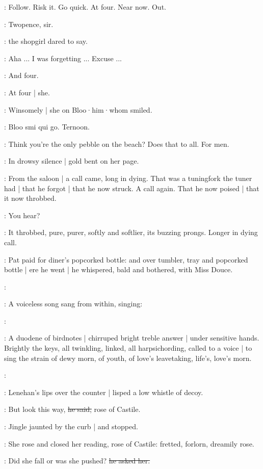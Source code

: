 \BloomIntA:
Follow.
Risk it.
Go quick.
At four.
Near now.
Out.

\shopgirl:
Twopence,
sir.

:
the shopgirl dared to say.

\Bloom:
Aha ...
I was forgetting ...
Excuse ...

\shopgirl:
And four.

\BloomIntA:
At four |
she.

:
Winsomely |
she on Bloo·him·whom smiled.

:
Bloo smi qui go.
Ternoon.

\BloomIntA:
Think you're the only pebble on the beach?
Does that to all.
For men.

:
In drowsy silence |
gold bent on her page.

:
From the saloon |
a call came,
long in dying.
That was a tuningfork the tuner had |
that he forgot |
that he now struck.
A call again.
That he now poised |
that it now throbbed.

\simon:
You hear?

:
It throbbed,
pure,
purer,
softly and softlier,
its buzzing prongs.
Longer in dying call.

:
Pat paid for diner's popcorked bottle:
and over tumbler, tray and popcorked bottle |
ere he went |
he whispered,
bald and bothered,
with Miss Douce.

\simon:

:
A voiceless song sang from within,
singing:

\simon:

:
A duodene of birdnotes |
chirruped bright treble answer |
under sensitive hands.
Brightly the keys,
all twinkling,
linked,
all harpsichording,
called to a voice |
to sing the strain of dewy morn,
of youth,
of love's leavetaking,
life's,
love's morn.

\simon:

:
Lenehan's lips over the counter |
lisped a low whistle of decoy.

\lenehan:
But look this way,
\sout{he said,}
rose of Castile.

:
Jingle jaunted by the curb |
and stopped.

:
She rose and closed her reading,
rose of Castile:
fretted,
forlorn,
dreamily rose.

\lenehan:
Did she fall or was she pushed?
\sout{he asked her.}

